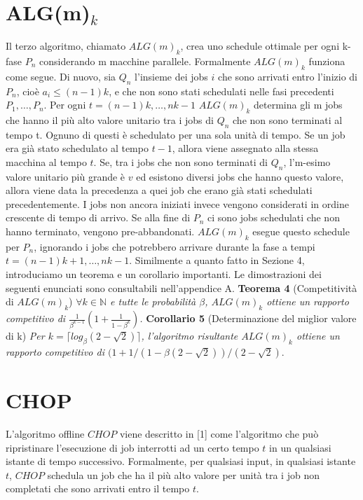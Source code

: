 \documentclass[twoside,openany,titlepage,fleqn,
	headinclude,12pt,a4paper,BCOR5mm,footinclude]{scrbook}
\newcommand*{\N}{\mathbb{N}}
\begin{document}
\section{ALG(m)$_{k}$}
Il terzo algoritmo, chiamato $ALG(m)_{k}$, crea uno schedule ottimale per ogni k-fase $P_{n}$ considerando m macchine parallele. Formalmente $ALG(m)_{k}$ funziona come segue. Di nuovo, sia $Q_{n}$ l’insieme dei jobs $i$ che sono arrivati entro l’inizio di $P_{n}$, cioè $a_{i} \leq (n - 1)k$, e che non sono stati schedulati nelle fasi precedenti $P_{1}, … , P_{n}$. Per ogni $t = (n-1)k, … , nk - 1$ $ALG(m)_{k}$ determina gli m jobs che hanno il più alto valore unitario tra i jobs di $Q_{n}$ che non sono terminati al tempo t. Ognuno di questi è schedulato per una sola unità di tempo. Se un job era già stato schedulato al tempo $t-1$, allora viene assegnato alla stessa macchina al tempo $t$. Se, tra i jobs che non sono terminati di $Q_{n}$, l’m-esimo valore unitario più grande è $v$ ed esistono diversi jobs che hanno questo valore, allora viene data la precedenza a quei job che erano già stati schedulati precedentemente. I jobs non ancora iniziati invece vengono considerati in ordine crescente di tempo di arrivo. Se alla fine di $P_{n}$ ci sono jobs schedulati che non hanno terminato, vengono pre-abbandonati. $ALG(m)_{k}$ esegue questo schedule per $P_{n}$, ignorando i jobs che potrebbero arrivare durante la fase a tempi $t = (n-1)k + 1, …, nk - 1$.
Similmente a quanto fatto in Sezione 4, introduciamo un teorema e un corollario importanti. Le dimostrazioni dei seguenti enunciati sono consultabili nell'appendice A.
\newline \newline
\textbf{Teorema 4} (Competitività di $ALG(m)_{k}$)
\textit{$\forall k \in \N$ e tutte le probabilità $\beta$, $ALG(m)_{k}$ ottiene un rapporto competitivo di $\frac{1}{\beta^{k-1}}(1 + \frac{1}{1-\beta^{k}})$.}
\newline \newline
\textbf{Corollario 5} (Determinazione del miglior valore di k)
\textit{Per $k = \lceil log_{\beta} (2 - \sqrt{2})\rceil$, l'algoritmo risultante $ALG(m)_{k}$ ottiene un rapporto competitivo di $(1 + 1 / (1 - \beta (2 - \sqrt{2})) / (2 - \sqrt{2}).$}
\section{CHOP} 
L'algoritmo offline $CHOP$ viene descritto in [1] come l'algoritmo che può ripristinare l'esecuzione di job interrotti ad un certo tempo $t$ in un qualsiasi istante di tempo successivo. Formalmente, per qualsiasi input, in qualsiasi istante $t$, $CHOP$ schedula un job che ha il più alto valore per unità tra i job non completati che sono arrivati entro il tempo $t$.
\end{document}
